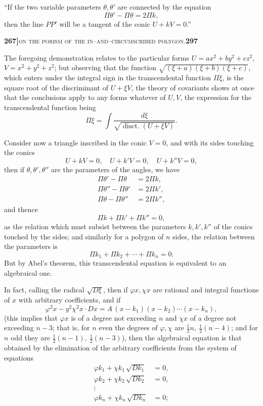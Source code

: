 \documentclass[11pt]{article}
\begin{document}
\medskip

\noindent ``If the two variable parameters $\theta, \theta'$ are connected by the equation
\[
   \Pi\theta' - \Pi\theta = 2\Pi k,
\]
then the line $P P'$ will be a tangent of the conic $U + kV = 0$.''

\newpage
\setcounter{page}{297}

\noindent\textbf{267]}\hfill\textsc{on the porism of the in--and--circumscribed polygon.}\hfill\textbf{297}

\medskip

\noindent The foregoing demonstration relates to the particular forms $U = a x^2 + b y^2 + c z^2$, $V = x^2 + y^2 + z^2$; but observing that the function $\sqrt{(\xi + a)(\xi + b)(\xi + c)}$, which enters under the integral sign in the transcendental function $\Pi\xi$, is the square root of the discriminant of $U + \xi V$, the theory of covariants shows at once that the conclusions apply to any forms whatever of $U, V$, the expression for the transcendental function being
\[
   \Pi\xi = \int\!\frac{d\xi}{\sqrt{\operatorname{disct.}(U + \xi V)}}.
\]

\medskip

\noindent Consider now a triangle inscribed in the conic $V = 0$, and with its sides touching the conics
\[
   U + k V = 0,\quad U + k' V = 0,\quad U + k'' V = 0,
\]
then if $\theta, \theta', \theta''$ are the parameters of the angles, we have
\[
\begin{aligned}
   \Pi\theta'  - \Pi\theta   &= 2\Pi k,\\
   \Pi\theta'' - \Pi\theta'  &= 2\Pi k',\\
   \Pi\theta   - \Pi\theta'' &= 2\Pi k'',
\end{aligned}
\]
and thence
\[
   \Pi k + \Pi k' + \Pi k'' = 0,
\]
as the relation which must subsist between the parameters $k, k', k''$ of the conics touched by the sides; and similarly for a polygon of $n$ sides, the relation between the parameters is
\[
   \Pi k_1 + \Pi k_2 + \cdots + \Pi k_n = 0.
\]
But by Abel's theorem, this transcendental equation is equivalent to an algebraical one.

\medskip

\noindent In fact, calling the radical $\sqrt{D\xi}$, then if $\varphi x, \chi x$ are rational and integral functions of $x$ with arbitrary coefficients, and if
\[
   \varphi^2 x - y^2\chi^2 x\cdot D x = A\,(x - k_1)(x - k_2)\cdots(x - k_n),
\]
(this implies that $\varphi x$ is of a degree not exceeding $n$ and $\chi x$ of a degree not exceeding $n - 3$; that is, for $n$ even the degrees of $\varphi, \chi$ are $\tfrac{1}{2}n,\ \tfrac{1}{2}(n - 4)$; and for $n$ odd they are $\tfrac{1}{2}(n - 1),\ \tfrac{1}{2}(n - 3)$), then the algebraical equation is that obtained by the elimination of the arbitrary coefficients from the system of equations
\[
\begin{aligned}
   \varphi k_1 + \chi k_1\,\sqrt{D k_1} &= 0,\\
   \varphi k_2 + \chi k_2\,\sqrt{D k_2} &= 0,\\
   \vdots\\
   \varphi k_n + \chi k_n\,\sqrt{D k_n} &= 0;
\end{aligned}
\]
\end{document}
